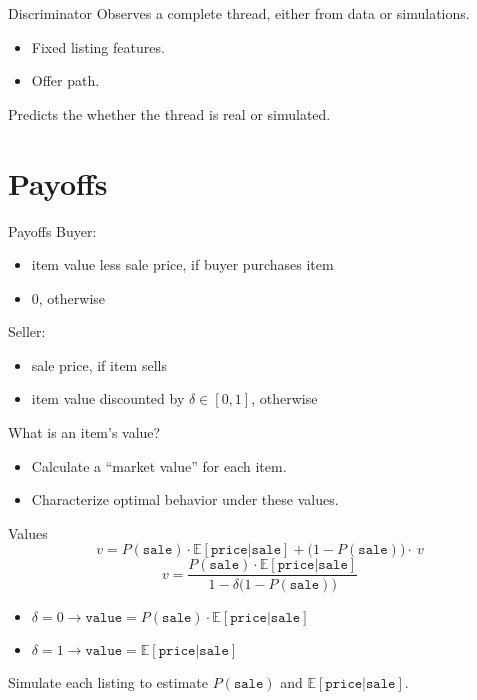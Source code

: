\documentclass[aspectratio=169]{beamer}
\begin{document}
\begin{frame}{Discriminator}
	Observes a complete thread, either from data or simulations.
	\begin{itemize}
		\item Fixed listing features.
		\item Offer path.
	\end{itemize}
	\vspace{5mm}
	Predicts the whether the thread is real or simulated.
\end{frame}

\begin{frame}{Discriminator performance}
	\begin{figure}
		\centering
		\texttt{[image: \\detokenize\{training/simple\_roc.png]}}
	\end{figure}
	AUC: 53.5\%
\end{frame}

\section{Payoffs}

\begin{frame}{Payoffs}
	Buyer:
	\begin{itemize}
		\item item value less sale price, if buyer purchases item
		\item 0, otherwise
	\end{itemize}\pause
	\vspace{5mm}
	Seller:
	\begin{itemize}
		\item sale price, if item sells
		\item item value discounted by $\delta \in [0, 1]$, otherwise
	\end{itemize}\pause
	\vspace{5mm}
	What is an item's value?
	\begin{itemize}
		\item Calculate a ``market value'' for each item.
		\item Characterize optimal behavior under these values.
	\end{itemize}
\end{frame}

\begin{frame}{Values}
	$$v = P(\texttt{sale}) \cdot \mathbb{E}[\texttt{price} | \texttt{sale}] + \big(1 - P(\texttt{sale})\big) \cdot \ v$$\pause
	$$v = \frac{P(\texttt{sale}) \cdot \mathbb{E}[\texttt{price} | \texttt{sale}]}{1 - \delta\big(1 - P(\texttt{sale})\big)}$$\pause
	\begin{itemize}
		\item $\delta = 0 \rightarrow \texttt{value} = P(\texttt{sale}) \cdot \mathbb{E}[\texttt{price} | \texttt{sale}]$
		\item $\delta = 1 \rightarrow \texttt{value} = \mathbb{E}[\texttt{price} | \texttt{sale}]$
	\end{itemize}\pause
	\vspace{5mm}
	Simulate each listing to estimate $P(\texttt{sale})$ and $\mathbb{E}[\texttt{price} | \texttt{sale}]$.
\end{frame}
\end{document}
